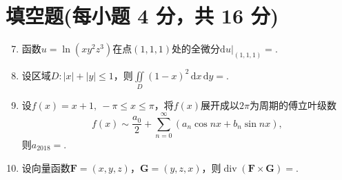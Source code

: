 \documentclass[../main.tex]{subfiles}
\begin{document}
\section{填空题(每小题 4 分，共 16 分)}
\begin{enumerate}
    \setcounter{enumi}{6}
    \item 函数$u=\ln(xy^2z^3)$在点$(1,1,1)$处的全微分$\mathrm{d}u|_{(1,1,1)}=$\underline{\hspace{3cm}}.

    \item 设区域$D:|x|+|y|\leq1$，则$\displaystyle\iint\limits_D(1-x)^2\,\mathrm{d}x\,\mathrm{d}y=$\underline{\hspace{3cm}}.

    \item 设$f(x)=x+1,\ -\pi\leq x\leq\pi$，将$f(x)$展开成以$2\pi$为周期的傅立叶级数
          \[
              f(x)\sim\frac{a_0}{2}+\sum_{n=0}^{\infty}(a_n\cos nx+b_n\sin nx),
          \]
          则$a_{2018}=$\underline{\hspace{3cm}}.

    \item 设向量函数$\boldsymbol{F}=(x,y,z)$，$\boldsymbol{G}=(y,z,x)$，则$\operatorname{div}(\boldsymbol{F}\times\boldsymbol{G})=$\underline{\hspace{3cm}}.
\end{enumerate}
\end{document}
